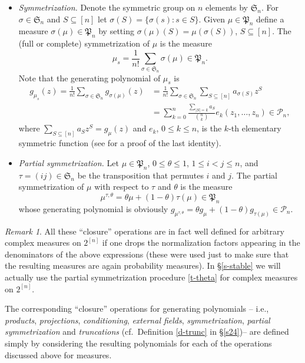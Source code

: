 \documentclass[10pt,reqno]{amsart}
\theoremstyle{plain}
\theoremstyle{definition}
\theoremstyle{remark}
\newtheorem{remark}{Remark}[section]
\newcommand{\PP}{\mathcal{P}}
\newcommand{\fP}{\mathfrak{P}}
\begin{document}
\begin{itemize}
which is well defined provided that $g_\mu(a_1,\ldots,a_n)\neq 0$.
\item[(v)]
{\em Symmetrization.} Denote the symmetric group on $n$ 
elements by $\mathfrak{S}_n$. For $\sigma\in \mathfrak{S}_n$ and 
$S\subseteq [n]$ let
$\sigma(S)=\{\sigma(s): s \in S\}$. Given $\mu\in\fP_n$ define a measure
$\sigma(\mu)\in\fP_n$ by setting $\sigma(\mu)(S)=\mu(\sigma(S))$, 
$S\subseteq [n]$. The (full or complete) symmetrization of 
$\mu$ is the measure 
$$\mu_s=\frac{1}{n!}\sum_{\sigma\in\mathfrak{S}_n}\sigma(\mu)\in \fP_n.$$ 
Note that the generating polynomial of $\mu_s$ is
\begin{equation}\label{sym}
\begin{split}
g_{\mu_s}(z)=\frac{1}{n!}\sum_{\sigma\in\mathfrak{S}_n}
g_{\sigma(\mu)}(z)
&=\frac{1}{n!}\sum_{\sigma\in\mathfrak{S}_n}\sum_{S\subseteq [n]}
a_{\sigma(S)}z^S\\
&=\sum_{k=0}^{n}\frac{\sum_{|S|=k}a_S}{\binom{n}{k}}
e_k(z_1,\ldots,z_n)\in\PP_n,
\end{split}
\end{equation}
where $\sum_{S\subseteq [n]}a_{S}z^S=g_{\mu}(z)$ and $e_k$, $0\le k\le n$, 
is the $k$-th elementary symmetric function (see \cite[\S 3.4]{W} for a proof
of the last identity). 
\item[(vi)]
{\em Partial symmetrization.} Let $\mu\in\fP_n$, $0\leq \theta \leq 1$, 
$1\leq i<j \leq n$, and $\tau=(ij)\in\mathfrak{S}_n$ be the transposition that 
permutes $i$ and $j$. The partial symmetrization of $\mu$ with respect to
$\tau$ and $\theta$ is the measure 
\begin{equation}\label{t-theta}
\mu^{\tau,\theta}
=\theta\mu+(1-\theta)\tau(\mu)\in\fP_n
\end{equation}
whose generating polynomial is obviously 
$g_{\mu^{\tau,\theta}}=\theta g_{\mu}+(1-\theta)g_{\tau(\mu)}\in\PP_n$.
\end{itemize}

\begin{remark}\label{r-complex}
All these ``closure'' operations are in fact well defined for arbitrary 
complex measures on $2^{[n]}$ if one drops the normalization factors 
appearing in the denominators of the
above expressions (these were used just to make sure that the resulting 
measures are again probability measures). 
In \S \ref{s-stable} we will actually use the partial symmetrization 
procedure \eqref{t-theta} for complex measures on $2^{[n]}$.
\end{remark}

The corresponding ``closure'' operations for generating polynomials -- i.e., 
{\em products}, 
{\em projections}, {\em conditioning}, {\em external fields}, 
{\em symmetrization}, {\em partial symmetrization} and {\em truncations} 
(cf.~Definition \ref{d-trunc} in \S \ref{s24})-- 
are defined simply by considering the resulting 
polynomials for each of the operations discussed above for measures.
\end{document}
